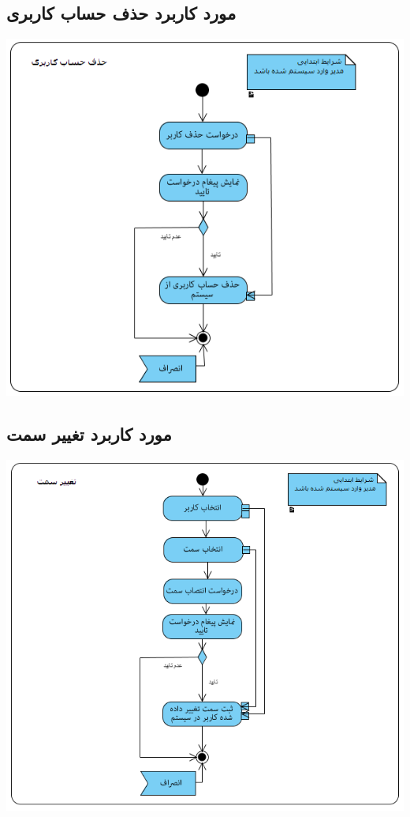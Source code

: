 \documentclass{article}
\begin{document}
\newpage
\vspace{2cm}
\subsection*{مورد کاربرد حذف حساب کاربری}
\vspace{2cm}
\begin{center}
\includegraphics[width=\textwidth]{ActivityDiagrams/7.png}
\end{center}

\newpage
\vspace{2cm}
\subsection*{مورد کاربرد تغییر سمت}
\vspace{2cm}
\begin{center}
\includegraphics[width=\textwidth]{ActivityDiagrams/8.png}
\end{center}
\end{document}
